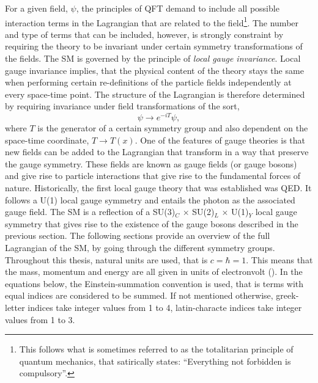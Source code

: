 For a given field, $\psi$, the principles of QFT demand to include all possible interaction terms in the Lagrangian that are related to the field\footnote{This follows what is sometimes referred to as the totalitarian principle of quantum mechanics, that satirically states: ``Everything not forbidden is compulsory''.}.
The number and type of terms that can be included, however, is strongly constraint by requiring the theory to be invariant under certain symmetry transformations of the fields. 
The SM is governed by the principle of \emph{local gauge invariance}. 
Local gauge invariance implies, that the physical content of the theory stays the same when performing certain re-definitions of the particle fields independently at every space-time point.
The structure of the Lagrangian is therefore determined by requiring invariance under field transformations of the sort,
\begin{equation}
  \psi \rightarrow e^{-iT} \psi,
\end{equation}
where $T$ is the generator of a certain symmetry group and also dependent on the space-time coordinate, $T \rightarrow T(x)$. 
One of the features of gauge theories is that new fields can be added to the Lagrangian that transform in a way that preserve the gauge symmetry. 
These fields are known as gauge fields (or gauge bosons) and give rise to particle interactions that give rise to the fundamental forces of nature. 
Historically, the first local gauge theory that was established was QED. It follows a U(1) local gauge symmetry and entails the photon as the associated gauge field. 
The SM is a reflection of a SU(3)$_C$ $\times$ SU(2)$_L$ $\times$ U(1)$_Y$ local gauge symmetry that gives rise to the existence of the gauge bosons described in the previous section. The following sections provide an overview of the full Lagrangian of the SM, by going through the different symmetry groups. Throughout this thesis, natural units are used, that is $c = \hbar = 1$. This means that the mass, momentum and energy are all given in units of electronvolt (\eV).
In the equations below, the Einstein-summation convention is used, that is terms with equal indices are considered to be summed. If not mentioned otherwise, greek-letter indices take integer values from 1 to 4, latin-characte indices take integer values from 1 to 3.


